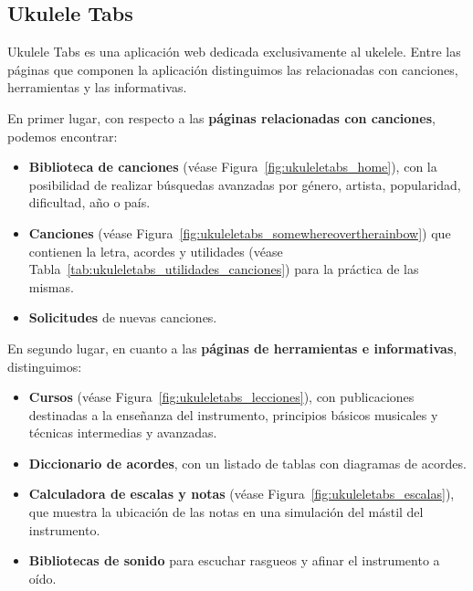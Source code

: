 \subsection{Ukulele Tabs}

Ukulele Tabs es una aplicación web dedicada exclusivamente al ukelele. Entre las páginas que componen la aplicación distinguimos las relacionadas con canciones, herramientas y las informativas.

En primer lugar, con respecto a las \textbf{páginas relacionadas con canciones}, podemos encontrar:

\begin{itemize}
    \item \textbf{Biblioteca de canciones} (véase Figura~\ref{fig:ukuleletabs_home}), con la posibilidad de realizar búsquedas avanzadas por género, artista, popularidad, dificultad, año o país.
    \item \textbf{Canciones} (véase Figura~\ref{fig:ukuleletabs_somewhereovertherainbow}) que contienen la letra, acordes y utilidades (véase Tabla~\ref{tab:ukuleletabs_utilidades_canciones}) para la práctica de las mismas.
    

    \item \textbf{Solicitudes} de nuevas canciones.
\end{itemize}

En segundo lugar, en cuanto a las \textbf{páginas de herramientas e informativas}, distinguimos:

\begin{itemize}
    \item \textbf{Cursos} (véase Figura~\ref{fig:ukuleletabs_lecciones}), con publicaciones destinadas a la enseñanza del instrumento, principios básicos musicales y técnicas intermedias y avanzadas.
    \item \textbf{Diccionario de acordes}, con un listado de tablas con diagramas de acordes.
    \item \textbf{Calculadora de escalas y notas} (véase Figura~\ref{fig:ukuleletabs_escalas}), que muestra la ubicación de las notas en una simulación del mástil del instrumento.
    \item  \textbf{Bibliotecas de sonido} para escuchar rasgueos y afinar el instrumento a oído.
\end{itemize}

